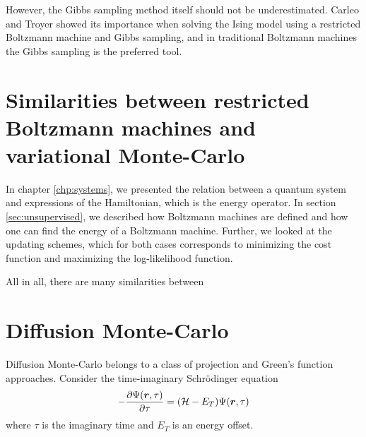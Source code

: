 However, the Gibbs sampling method itself should not be underestimated. Carleo and Troyer showed its importance when solving the Ising model using a restricted Boltzmann machine and Gibbs sampling, and in traditional Boltzmann machines the Gibbs sampling is the preferred tool. \cite{carleo_solving_2017}

\section{Similarities between restricted Boltzmann machines and variational Monte-Carlo}
In chapter \ref{chp:systems}, we presented the relation between a quantum system and expressions of the Hamiltonian, which is the energy operator. In section \ref{sec:unsupervised}, we described how Boltzmann machines are defined and how one can find the energy of a Boltzmann machine. Further, we looked at the updating schemes, which for both cases corresponds to minimizing the cost function and maximizing the log-likelihood function. 

All in all, there are many similarities between 

\section{Diffusion Monte-Carlo}
Diffusion Monte-Carlo belongs to a class of projection and Green's function approaches. Consider the time-imaginary Schrödinger equation
\begin{eqnarray}
-\frac{\partial\Psi(\boldsymbol{{r}},\tau)}{\partial\tau}=(\mathcal{H}-E_T)\Psi(\boldsymbol{{r}},\tau)
\end{eqnarray}
where $\tau$ is the imaginary time and $E_T$ is an energy offset. 

